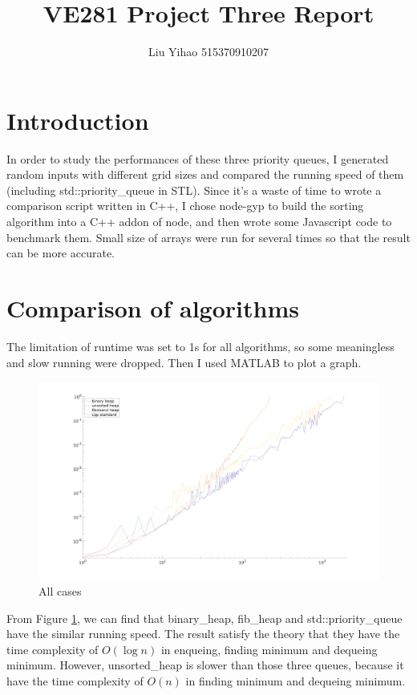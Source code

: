 \documentclass{article}
\title{VE281 Project Three Report}
\author{Liu Yihao 515370910207}
\date{}
\begin{document}
\maketitle

\section{Introduction}

In order to study the performances of these three priority queues, I generated random inputs with different grid sizes and compared the running speed of them (including std::priority\_queue in STL). Since it's a waste of time to wrote a comparison script written in C++, I chose node-gyp to build the sorting algorithm into a C++ addon of node, and then wrote some Javascript code to benchmark them. Small size of arrays were run for several times so that the result can be more accurate.

\section{Comparison of algorithms}

The limitation of runtime was set to 1s for all algorithms, so some meaningless and slow running were dropped. Then I used MATLAB to plot a graph.

\begin{figure}[!htbp]
\centering
\includegraphics[width=0.8\linewidth]{../benchmark/fig1.png}
\caption{All cases}
\label{fig-1}
\end{figure}

From Figure \ref{fig-1}, we can find that binary\_heap, fib\_heap and std::priority\_queue have the similar running speed. The result satisfy the theory that they have the time complexity of $O(\log n)$ in enqueing, finding minimum and dequeing minimum. However, unsorted\_heap is slower than those three queues, because it have the time complexity of $O(n)$ in finding minimum and dequeing minimum. 
\end{document}
